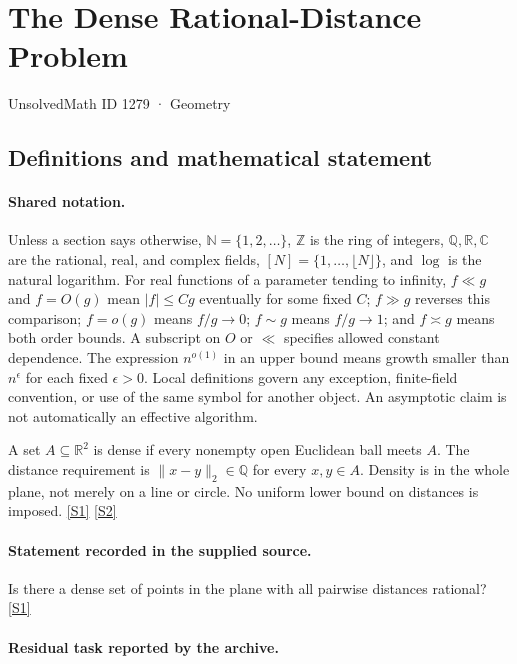 \documentclass[11pt,a4paper]{article}
\newcommand{\N}{\mathbb{N}}
\newcommand{\Z}{\mathbb{Z}}
\newcommand{\Q}{\mathbb{Q}}
\newcommand{\R}{\mathbb{R}}
\newcommand{\C}{\mathbb{C}}
\newcommand{\sref}[2]{\hyperlink{source:#1:#2}{[S#2]}}
\begin{document}

\setcounter{section}{1278}

\section{The Dense Rational-Distance Problem}\label{1279}

{\small\sffamily UnsolvedMath ID 1279 · Geometry}

\subsection{Definitions and mathematical statement}

\paragraph{Shared notation.}Unless a section says otherwise, $\N=\{1,2,\ldots\}$,
$\Z$ is the ring of integers, $\Q,\R,\C$ are the rational, real, and complex
fields, $[N]=\{1,\ldots,\lfloor N\rfloor\}$, and $\log$ is the natural
logarithm. For real functions of a parameter tending to infinity,
$f\ll g$ and $f=O(g)$ mean $|f|\leq Cg$ eventually for some fixed $C$;
$f\gg g$ reverses this comparison; $f=o(g)$ means $f/g\to0$;
$f\sim g$ means $f/g\to1$; and $f\asymp g$ means both order bounds.
A subscript on $O$ or $\ll$ specifies allowed constant dependence.
The expression $n^{o(1)}$ in an upper bound means growth smaller than
$n^\epsilon$ for each fixed $\epsilon>0$. Local definitions govern any
exception, finite-field convention, or use of the same symbol for another
object. An asymptotic claim is not automatically an effective algorithm.



A set $A\subseteq\R^2$ is dense if every nonempty open Euclidean ball meets $A$. The distance requirement is $\|x-y\|_2\in\Q$ for every $x,y\in A$. Density is in the whole plane, not merely on a line or circle. No uniform lower bound on distances is imposed. \sref{1279}{1} \sref{1279}{2}

\paragraph{Statement recorded in the supplied source.}
Is there a dense set of points in the plane with all pairwise distances rational? \sref{1279}{1}

\paragraph{Residual task reported by the archive.}
\end{document}
